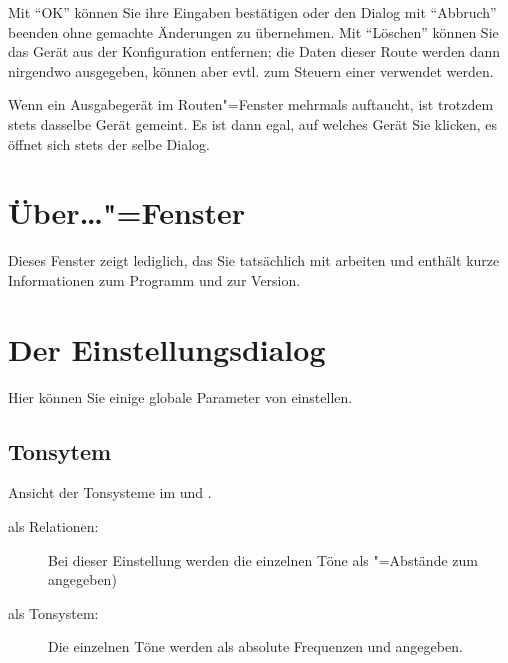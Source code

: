 {Mit "`OK"' können Sie ihre Eingaben bestätigen oder den Dialog 
mit "`Abbruch"' beenden ohne gemachte Änderungen zu übernehmen. 
Mit "`Löschen"' können Sie das Gerät aus der Konfiguration 
entfernen; die Daten dieser Route werden dann nirgendwo ausgegeben, 
können aber evtl. zum Steuern einer  verwendet 
werden.

Wenn ein Ausgabegerät im Routen"=Fenster mehrmals auftaucht, 
ist trotzdem stets dasselbe Gerät gemeint. Es ist dann egal, 
auf welches Gerät Sie klicken, es öffnet sich stets der selbe 
Dialog.

\section{Über…"=Fenster}\label{sec:DE_ABOUT}

Dieses Fenster zeigt lediglich, das Sie tatsächlich mit \mutabor{} 
arbeiten und enthält kurze Informationen zum Programm und zur 
Version.

\section{Der Einstellungsdialog}\label{sec:DE_SETUP}
Hier können Sie einige globale Parameter von \mutabor{} einstellen.

\subsection{Tonsytem}
Ansicht der Tonsysteme im
 und
.
\begin{description}
\item[als Relationen:] Bei dieser Einstellung werden
  die einzelnen Töne als "=Abstände zum
   angegeben)
\item[als Tonsystem:] Die einzelnen Töne werden als
  absolute Frequenzen und 
  angegeben.
\end{description}

}
